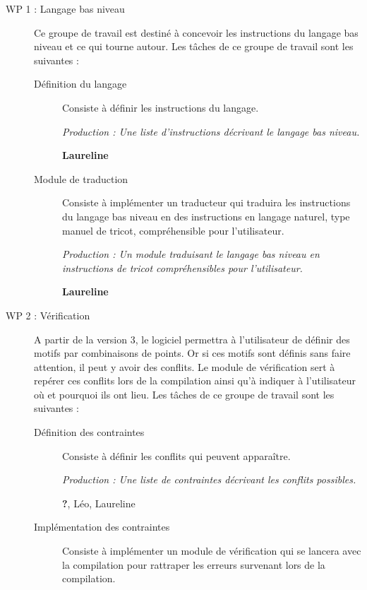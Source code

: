 \documentclass{article}
\begin{document}
\begin{description}
\item[WP 1 : Langage bas niveau] Ce groupe de travail est destiné à concevoir les instructions du langage bas niveau et ce qui tourne 
autour. Les tâches de ce groupe de travail sont les suivantes :

    \begin{description}
    \item[Définition du langage] Consiste à définir les instructions du langage.

      \textit{Production : Une liste d'instructions décrivant le langage bas niveau.}

      \textbf{Laureline}

    \item[Module de traduction] Consiste à implémenter un traducteur qui traduira les instructions du langage bas niveau en des 
instructions en langage naturel, type manuel de tricot, compréhensible pour l'utilisateur.

      \textit{Production : Un module traduisant le langage bas niveau en instructions de tricot compréhensibles pour l'utilisateur.}

      \textbf{Laureline}
    \end{description}

\medskip

\item[WP 2 : Vérification] A partir de la version 3, le logiciel permettra à l'utilisateur de définir des motifs par combinaisons de 
points. Or si ces motifs sont définis sans faire attention, il peut y avoir des conflits. Le module de vérification sert à repérer ces 
conflits lors de la compilation ainsi qu'à indiquer à l'utilisateur où et pourquoi ils ont lieu. Les tâches de ce groupe de travail sont 
les suivantes :

    \begin{description}
    \item[Définition des contraintes] Consiste à définir les conflits qui peuvent apparaître.
      
      \textit{Production : Une liste de contraintes décrivant les conflits possibles.}

      \textbf{?}, Léo, Laureline

    \item[Implémentation des contraintes] Consiste à implémenter un module de vérification qui se lancera avec la compilation pour 
rattraper les erreurs survenant lors de la compilation.
      

\end{description}
\end{description}
\end{document}

